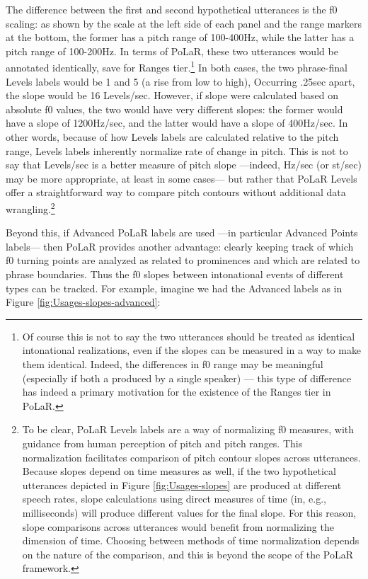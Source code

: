 \documentclass[11pt, twoside]{memoir}
\begin{document}
The difference between the first and second hypothetical utterances is the f0 scaling: as shown by the scale at the left side of each panel and the range markers at the bottom, the former has a pitch range of 100-400Hz, while the latter has a pitch range of 100-200Hz. In terms of PoLaR, these two utterances would be annotated identically, save for Ranges tier.\footnote{Of course this is not to say the two utterances should be treated as identical intonational realizations, even if the slopes can be measured in a way to make them identical. Indeed, the differences in f0 range may be meaningful (especially if both a produced by a single speaker) — this type of difference has indeed a primary motivation for the existence of the Ranges tier in PoLaR.} In both cases, the two phrase-final Levels labels would be 1 and 5 (a rise from low to high), Occurring .25sec apart, the slope would be 16 Levels/sec. However, if slope were calculated based on absolute f0 values, the two would have very different slopes: the former would have a slope of 1200Hz/sec, and the latter would have a slope of 400Hz/sec. In other words, because of how Levels labels are calculated relative to the pitch range, Levels labels inherently normalize rate of change in pitch. This is not to say that Levels/sec is a better measure of pitch slope —indeed, Hz/sec (or st/sec) may be more appropriate, at least in some cases— but rather that PoLaR Levels offer a straightforward way to compare pitch contours without additional data wrangling.\footnote{To be clear, PoLaR Levels labels are a way of normalizing f0 measures, with guidance from human perception of pitch and pitch ranges. This normalization facilitates comparison of pitch contour slopes across utterances. Because slopes depend on time measures as well, if the two hypothetical utterances depicted in Figure \ref{fig:Usages-slopes} %
are produced at different speech rates, slope calculations using direct measures of time (in, e.g., milliseconds) will produce different values for the final slope. For this reason, slope comparisons across utterances would benefit from  normalizing the dimension of time. Choosing between methods of time normalization depends on the nature of the comparison, and this is beyond the scope of the PoLaR framework.}

Beyond this, if Advanced PoLaR labels are used —in particular Advanced Points labels— then PoLaR provides another advantage: clearly keeping track of which f0 turning points are analyzed as related to prominences and which are related to phrase boundaries. Thus the f0 slopes between intonational events of different types can be tracked. For example, imagine we had the Advanced labels as in Figure \ref{fig:Usages-slopes-advanced}:
\end{document}

